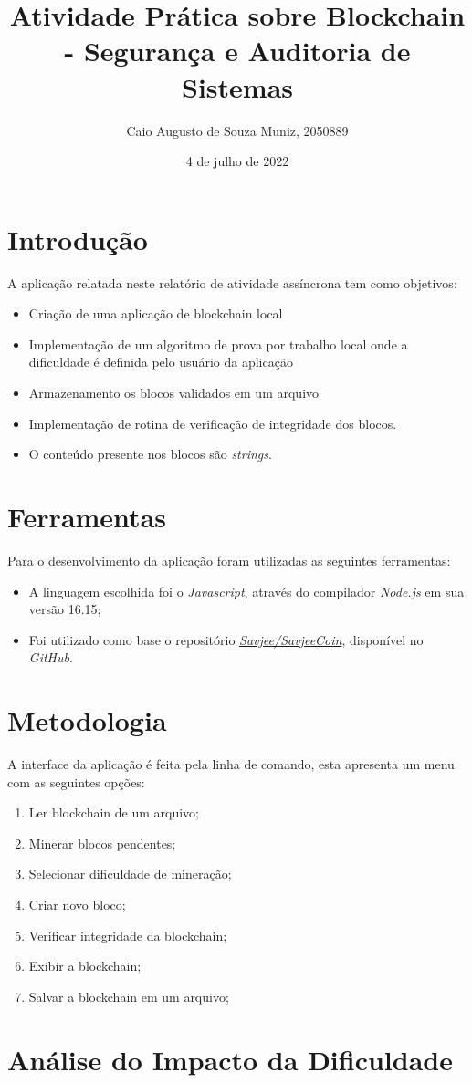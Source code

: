 \documentclass{article}
\title{Atividade Prática sobre Blockchain - Segurança e Auditoria de Sistemas}
\author{Caio Augusto de Souza Muniz, 2050889}
\date{4 de julho de 2022}
\begin{document}
\maketitle

\section{Introdução}
A aplicação relatada neste relatório de atividade assíncrona tem como objetivos:
\begin{itemize}
    \item Criação de uma aplicação de blockchain local
    \item Implementação de um algoritmo de prova por trabalho local onde a dificuldade é definida pelo usuário da aplicação
    \item Armazenamento os blocos validados em um arquivo
    \item Implementação de rotina de verificação de integridade dos blocos.
    \item O conteúdo presente nos blocos são \textit{strings}.
\end{itemize}
\section{Ferramentas}
Para o desenvolvimento da aplicação foram utilizadas as seguintes ferramentas:
\begin{itemize}
    \item A linguagem escolhida foi o \textit{Javascript}, através do compilador \textit{Node.js} em sua versão 16.15;
    \item Foi utilizado como base o repositório \href{https://github.com/Savjee/SavjeeCoin}{\textit{Savjee/SavjeeCoin}}, disponível no \textit{GitHub}.
\end{itemize}
\section{Metodologia}
A interface da aplicação é feita pela linha de comando, esta apresenta um menu com as seguintes opções:
\begin{enumerate}
    \item Ler blockchain de um arquivo;
    \item Minerar blocos pendentes;
    \item Selecionar dificuldade de mineração;
    \item Criar novo bloco;
    \item Verificar integridade da blockchain;
    \item Exibir a blockchain;
    \item Salvar a blockchain em um arquivo;
\end{enumerate}
\section{Análise do Impacto da Dificuldade}
\end{document}
